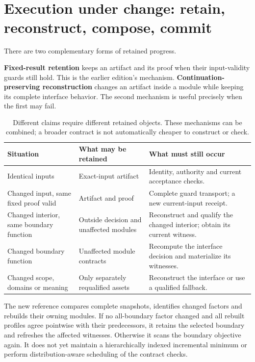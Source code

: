 \documentclass[11pt,letterpaper]{article}
\theoremstyle{definition}\newtheorem{definition}[theorem]{Definition}
\theoremstyle{remark}\newtheorem{remark}[theorem]{Remark}
\begin{document}
\section{Execution under change: retain, reconstruct, compose, commit}
\label{sec:execution}
There are two complementary forms of retained progress.

\textbf{Fixed-result retention} keeps an artifact and its proof when their input-validity guards still hold. This is the earlier edition's mechanism. \textbf{Continuation-preserving reconstruction} changes an artifact inside a module while keeping its complete interface behavior. The second mechanism is useful precisely when the first may fail.

\begin{table}[htbp]\centering\small
\caption{Different claims require different retained objects. These mechanisms can be combined; a broader contract is not automatically cheaper to construct or check.}
\begin{tabularx}{\linewidth}{@{}P{.21\linewidth}YY@{}}\toprule
Situation & What may be retained & What must still occur\\\midrule
Identical inputs & Exact-input artifact & Identity, authority and current acceptance checks.\\
Changed input, same fixed proof valid & Artifact and proof & Complete guard transport; a new current-input receipt.\\
Changed interior, same boundary function & Outside decision and unaffected modules & Reconstruct and qualify the changed interior; obtain its current witness.\\
Changed boundary function & Unaffected module contracts & Recompute the interface decision and materialize its witnesses.\\
Changed scope, domains or meaning & Only separately requalified assets & Reconstruct the interface or use a qualified fallback.\\\bottomrule
\end{tabularx}
\label{tab:levels}
\end{table}

The new reference compares complete snapshots, identifies changed factors and rebuilds their owning modules. If no all-boundary factor changed and all rebuilt profiles agree pointwise with their predecessors, it retains the selected boundary and refreshes the affected witnesses. Otherwise it scans the boundary objective again. It does not yet maintain a hierarchically indexed incremental minimum or perform distribution-aware scheduling of the contract checks.
\end{document}
